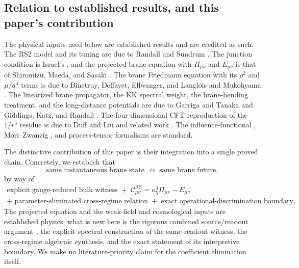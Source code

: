 \documentclass[11pt,a4paper]{article}
\theoremstyle{plain}
\theoremstyle{definition}
\newcommand{\kfive}{\kappa_5}
\newcommand{\RS}{\mathrm{RS}}
\begin{document}
\subsection{Relation to established results, and this paper's contribution}
\label{sec:relation}

The physical inputs used below are established results and are credited as
such. The RS2 model and its tuning are due to Randall and Sundrum
\cite{RS2}. The junction condition is Israel's \cite{Israel}, and the
projected brane equation with $\Pi_{\mu\nu}$ and $E_{\mu\nu}$ is that of
Shiromizu, Maeda, and Sasaki \cite{SMS}. The brane Friedmann equation with
its $\rho^2$ and $\mu/a^4$ terms is due to Binetruy, Deffayet, Ellwanger,
and Langlois \cite{BDEL} and Mukohyama \cite{Mukohyama1,Mukohyama2}. The
linearized brane propagator, the KK spectral weight, the brane-bending
treatment, and the long-distance potentials are due to Garriga and Tanaka
\cite{GarrigaTanaka} and Giddings, Katz, and Randall \cite{GKR}. The
four-dimensional CFT reproduction of the $1/r^3$ residue is due to Duff
and Liu \cite{DuffLiu} and related work
\cite{APR,PerezVictoria}. The influence-functional
\cite{FeynmanVernon}, Mori--Zwanzig \cite{MoriZwanzig}, and process-tensor
\cite{Pollock} formalisms are standard.

The distinctive contribution of this paper is their integration into a
single proved chain. Concretely, we establish that
\begin{equation}
\label{eq:chain}
\text{same instantaneous brane state}
\;\not\Rightarrow\;
\text{same brane future},
\end{equation}
by way of
\begin{equation}
\label{eq:chain2}
\begin{gathered}
\text{explicit gauge-reduced bulk witness}
\;+\;
\mathcal C^{\RS}_{\mu\nu}=\kfive^4\Pi_{\mu\nu}-E_{\mu\nu}\\
+\;\text{parameter-eliminated cross-regime relation}
\;+\;\text{exact operational-discrimination boundary}.
\end{gathered}
\end{equation}
The projected equation and the weak-field and cosmological inputs are
established physics; what is new here is the rigorous combined
source/readout argument \cite{Paper1,Paper2,Paper3,Paper4,Paper5,Paper6},
the explicit spectral construction of the
same-readout witness, the cross-regime algebraic synthesis, and the exact
statement of its interpretive boundary. We make no literature-priority
claim for the coefficient elimination itself.
\end{document}
